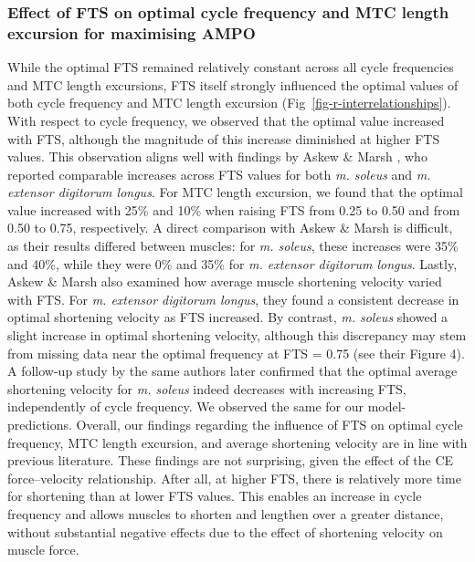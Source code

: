 \documentclass[
  10pt,
  letterpaper,
]{article}
\begin{document}
\subsubsection{Effect of FTS on optimal cycle frequency and MTC length
excursion for maximising
AMPO}\label{effect-of-fts-on-optimal-cycle-frequency-and-mtc-length-excursion-for-maximising-ampo}

While the optimal FTS remained relatively constant across all cycle
frequencies and MTC length excursions, FTS itself strongly influenced
the optimal values of both cycle frequency and MTC length excursion
(Fig~\ref{fig-r-interrelationships}). With respect to cycle frequency,
we observed that the optimal value increased with FTS, although the
magnitude of this increase diminished at higher FTS values. This
observation aligns well with findings by {Askew \& Marsh
\citep{askew_effects_1997}}, who reported comparable increases across
FTS values for both \emph{m. soleus} and \emph{m. extensor digitorum
longus}. For MTC length excursion, we found that the optimal value
increased with 25\% and 10\% when raising FTS from 0.25 to 0.50 and from
0.50 to 0.75, respectively. A direct comparison with {Askew \& Marsh
\citep{askew_effects_1997}} is difficult, as their results differed
between muscles: for \emph{m. soleus}, these increases were 35\% and
40\%, while they were 0\% and 35\% for \emph{m. extensor digitorum
longus}. Lastly, {Askew \& Marsh \citep{askew_effects_1997}} also
examined how average muscle shortening velocity varied with FTS. For
\emph{m. extensor digitorum longus}, they found a consistent decrease in
optimal shortening velocity as FTS increased. By contrast, \emph{m.
soleus} showed a slight increase in optimal shortening velocity,
although this discrepancy may stem from missing data near the optimal
frequency at FTS = 0.75 (see their Figure 4). A follow-up study by the
same authors \citep{askew_optimal_1998} later confirmed that the optimal
average shortening velocity for \emph{m. soleus} indeed decreases with
increasing FTS, independently of cycle frequency. We observed the same
for our model-predictions. Overall, our findings regarding the influence
of FTS on optimal cycle frequency, MTC length excursion, and average
shortening velocity are in line with previous literature. These findings
are not surprising, given the effect of the CE force--velocity
relationship. After all, at higher FTS, there is relatively more time
for shortening than at lower FTS values. This enables an increase in
cycle frequency and allows muscles to shorten and lengthen over a
greater distance, without substantial negative effects due to the effect
of shortening velocity on muscle force.
\end{document}
